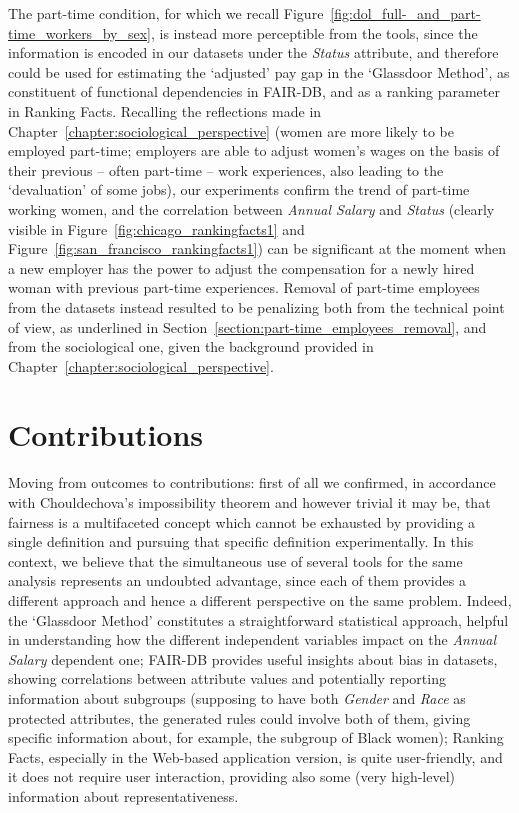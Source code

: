 The part-time condition, for which we recall Figure~\ref{fig:dol_full-_and_part-time_workers_by_sex}, is instead more perceptible from the tools, since the information is encoded in our datasets under the \textit{Status} attribute, and therefore could be used for estimating the `adjusted' pay gap in the `Glassdoor Method', as constituent of functional dependencies in FAIR-DB, and as a ranking parameter in Ranking Facts. Recalling the reflections made in Chapter~\ref{chapter:sociological_perspective} (women are more likely to be employed part-time; employers are able to adjust women's wages on the basis of their previous -- often part-time -- work experiences, also leading to the `devaluation' of some jobs), our experiments confirm the trend of part-time working women, and the correlation between \textit{Annual Salary} and \textit{Status} (clearly visible in Figure~\ref{fig:chicago_rankingfacts1} and Figure~\ref{fig:san_francisco_rankingfacts1}) can be significant at the moment when a new employer has the power to adjust the compensation for a newly hired woman with previous part-time experiences.
Removal of part-time employees from the datasets instead resulted to be penalizing both from the technical point of view, as underlined in Section~\ref{section:part-time_employees_removal}, and from the sociological one, given the background provided in Chapter~\ref{chapter:sociological_perspective}.


\section{Contributions}
Moving from outcomes to contributions: first of all we confirmed, in accordance with Chouldechova's impossibility theorem \cite{chouldechova2017fair} and however trivial it may be, that fairness is a multifaceted concept which cannot be exhausted by providing a single definition and pursuing that specific definition experimentally. In this context, we believe that the simultaneous use of several tools for the same analysis represents an undoubted advantage, since each of them provides a different approach and hence a different perspective on the same problem. Indeed, the `Glassdoor Method' constitutes a straightforward statistical approach, helpful in understanding how the different independent variables impact on the \textit{Annual Salary} dependent one; FAIR-DB provides useful insights about bias in datasets, showing correlations between attribute values and potentially reporting information about subgroups (supposing to have both \textit{Gender} and \textit{Race} as protected attributes, the generated rules could involve both of them, giving specific information about, for example, the subgroup of Black women); Ranking Facts, especially in the Web-based application version, is quite user-friendly, and it does not require user interaction, providing also some (very high-level) information about representativeness.

